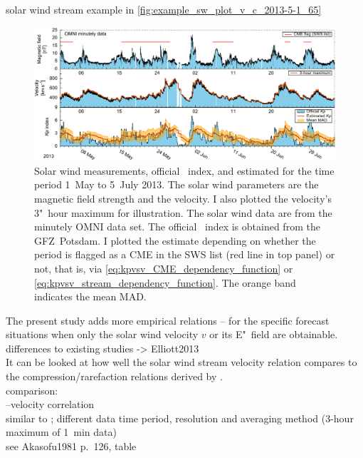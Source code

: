 solar wind stream example in \autoref{fig:example_sw_plot_v_c_2013-5-1_65}\\
\begin{figure}[htb]
	\centering
	\includegraphics[width=\textwidth]{figures_of_mine/chapter2/example_sw_plot_v_c_2013-5-1_65.pdf}
	\caption[]
	{Solar wind measurements, official \Kp{}~index, and estimated \Kp{} for the time period 1~May to 5~July 2013. The solar wind parameters are the magnetic field strength and the velocity. I also plotted the velocity's 3"~hour maximum for illustration. The solar wind data are from the minutely OMNI data set. The official \Kp{}~index is obtained from the GFZ~Potsdam. I plotted the \Kp{} estimate depending on whether the period is flagged as a CME in the SWS list (red line in top panel) or not, that is, via \autoref{eq:kpvsv_CME_dependency_function} or \autoref{eq:kpvsv_stream_dependency_function}. The orange band indicates the mean MAD.}
	\label{fig:example_sw_plot_v_c_2013-5-1_65}
\end{figure}


The present study adds more empirical \Kp{} relations -- for the specific forecast situations when only the solar wind velocity $v$ or its E"~field are obtainable.\\

differences to existing studies -> Elliott2013\\
It can be looked at how well the solar wind stream velocity relation compares to the compression/rarefaction relations derived by \citet{Elliott2013}.\\

comparison:\\
\Kp--velocity correlation\\
similar to \citet{Elliott2013}; different data time period, resolution and averaging method (3-hour maximum of 1~min data)\\
see Akasofu1981 p.~126, table\\


